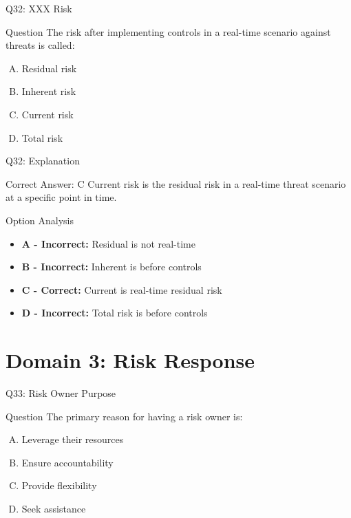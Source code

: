 \documentclass{beamer}
\begin{document}
	
	\begin{frame}{Q32: XXX Risk}
		\begin{block}{Question}
			The risk after implementing controls in a real-time scenario against threats is called:
		\end{block}
		\begin{enumerate}[(A)]
			\item Residual risk
			\item Inherent risk
			\item Current risk
			\item Total risk
		\end{enumerate}
	\end{frame}
	
	\begin{frame}{Q32: Explanation}
		\begin{block}{Correct Answer: C}
			Current risk is the residual risk in a real-time threat scenario at a specific point in time.
		\end{block}
		\begin{block}{Option Analysis}
			\begin{itemize}
				\item \textbf{A - Incorrect:} Residual is not real-time
				\item \textbf{B - Incorrect:} Inherent is before controls
				\item \textbf{C - Correct:} Current is real-time residual risk
				\item \textbf{D - Incorrect:} Total risk is before controls
			\end{itemize}
		\end{block}
	\end{frame}
	
	
	\section{Domain 3: Risk Response}
	
	\begin{frame}{Q33: Risk Owner Purpose}
		\begin{block}{Question}
			The primary reason for having a risk owner is:
		\end{block}
		\begin{enumerate}[(A)]
			\item Leverage their resources
			\item Ensure accountability
			\item Provide flexibility
			\item Seek assistance
		\end{enumerate}
	\end{frame}
	
\end{document}
